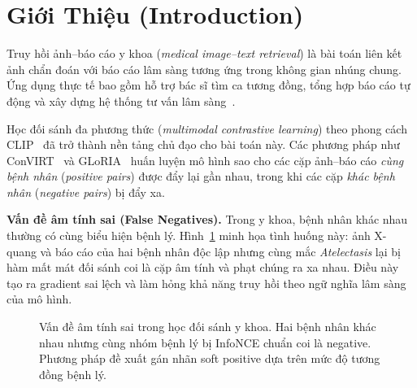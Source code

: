 \documentclass[12pt, a4paper]{article}
\begin{document}
\section{Giới Thiệu (Introduction)}
\label{sec:intro}

Truy hồi ảnh--báo cáo y khoa (\textit{medical image--text retrieval}) là bài
toán liên kết ảnh chẩn đoán với báo cáo lâm sàng tương ứng trong không gian
nhúng chung. Ứng dụng thực tế bao gồm hỗ trợ bác sĩ tìm ca tương đồng, tổng
hợp báo cáo tự động và xây dựng hệ thống tư vấn lâm sàng~\citep{jing2018automatic}.

Học đối sánh đa phương thức (\textit{multimodal contrastive learning}) theo phong
cách CLIP~\citep{radford2021learning} đã trở thành nền tảng chủ đạo cho bài toán
này. Các phương pháp như ConVIRT~\citep{zhang2022contrastive} và
GLoRIA~\citep{huang2021gloria} huấn luyện mô hình sao cho các cặp ảnh--báo cáo
\emph{cùng bệnh nhân} (\textit{positive pairs}) được đẩy lại gần nhau, trong khi
các cặp \emph{khác bệnh nhân} (\textit{negative pairs}) bị đẩy xa.

\textbf{Vấn đề âm tính sai (False Negatives).}  Trong y khoa, bệnh nhân khác
nhau thường có cùng biểu hiện bệnh lý. Hình~\ref{fig:false_negative_motivation}
minh họa tình huống này: ảnh X-quang và báo cáo của hai bệnh nhân độc lập nhưng
cùng mắc \textit{Atelectasis} lại bị hàm mất mát đối sánh coi là cặp âm tính và
phạt chúng ra xa nhau. Điều này tạo ra gradient sai lệch và làm hỏng khả năng truy
hồi theo ngữ nghĩa lâm sàng của mô hình.

\begin{figure}[H]
  \centering
  \caption{Vấn đề âm tính sai trong học đối sánh y khoa. Hai bệnh nhân khác nhau
    nhưng cùng nhóm bệnh lý bị InfoNCE chuẩn coi là negative. Phương pháp đề xuất
    gán nhãn soft positive dựa trên mức độ tương đồng bệnh lý.}
  \label{fig:false_negative_motivation}
\end{figure}
\end{document}
